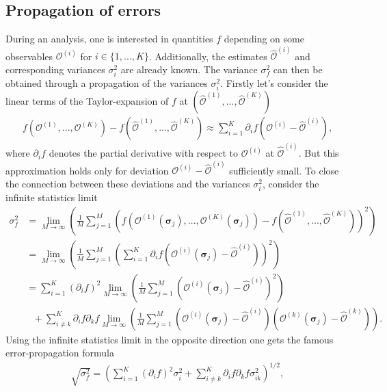 \subsection*{Propagation of errors}

During an analysis, one is interested in quantities $f$ depending on some observables $\mathcal{O}^{(i)}$ for $i\!\in\!\{1,...,K\}$. Additionally, 
the estimates $\hat{\mathcal{O}}^{(i)}$ and corresponding variances $\sigma^2_i$ are already known. The variance $\sigma^2_f$ can then be 
obtained through a propagation of the variances $\sigma^2_i$. Firstly let's consider
the linear terms of the Taylor-expansion of $f$ at $(\hat{\mathcal{O}}^{(1)},...,\hat{\mathcal{O}}^{(K)})$ 
\begin{align*}
    f(\mathcal{O}^{(1)},...,\mathcal{O}^{(K)})-f(\hat{\mathcal{O}}^{(1)},...,\hat{\mathcal{O}}^{(K)})
    \approx\sum_{i=1}^K\partial_if\left(\mathcal{O}^{(i)}\!-\!\hat{\mathcal{O}}^{(i)}\right),
\end{align*}
where $\partial_if$ denotes the partial derivative with respect to $\mathcal{O}^{(i)}$ at $\hat{\mathcal{O}}^{(i)}$. But this approximation holds only for 
deviation $\mathcal{O}^{(i)}\!-\!\hat{\mathcal{O}}^{(i)}$ sufficiently small. To close the connection between these 
deviations and the variances $\sigma^2_i$, consider the infinite statistics limit 
\begin{align*}
    \sigma^2_f &= \lim_{M\to\infty}\left(\frac{1}{M}\sum_{j=1}^M\left(f(\mathcal{O}^{(1)}\!(\bm{\sigma}_j),...,\mathcal{O}^{(K)}\!(\bm{\sigma}_j))-f(\hat{\mathcal{O}}^{(1)},...,\hat{\mathcal{O}}^{(K)})\right)^2\right)\\
               &= \lim_{M\to\infty}\left(\frac{1}{M}\sum_{j=1}^M\left(\sum_{i=1}^K\partial_if\left(\mathcal{O}^{(i)}\!(\bm{\sigma}_j)\!-\!\hat{\mathcal{O}}^{(i)}\right)\right)^2\right)\\
               &= \sum_{i=1}^K(\partial_if)^2\lim_{M\to\infty}\left(\frac{1}{M}\sum_{j=1}^M\left(\mathcal{O}^{(i)}\!(\bm{\sigma}_j)\!-\!\hat{\mathcal{O}}^{(i)}\right)^2\right)\\
               &\  \  \  +\sum_{i\neq k}^K\partial_if\partial_kf\lim_{M\to\infty}\left(\frac{1}{M}\sum_{j=1}^M\left(\mathcal{O}^{(i)}\!(\bm{\sigma}_j)\!-\!\hat{\mathcal{O}}^{(i)}\right)\left(\mathcal{O}^{(k)}\!(\bm{\sigma}_j)\!-\!\hat{\mathcal{O}}^{(k)}\right)\right).
\end{align*}
Using the infinite statistics limit in the opposite direction one gets the famous error-propagation
formula
\begin{align}
    \sqrt{\sigma^2_f}=\left(\sum_{i=1}^K(\partial_if)^2\sigma^2_i+\sum_{i\neq k}^K\partial_if\partial_kf\sigma^2_{ik}\right)^{1/2},
    \label{align:Error_propagation}
\end{align}
